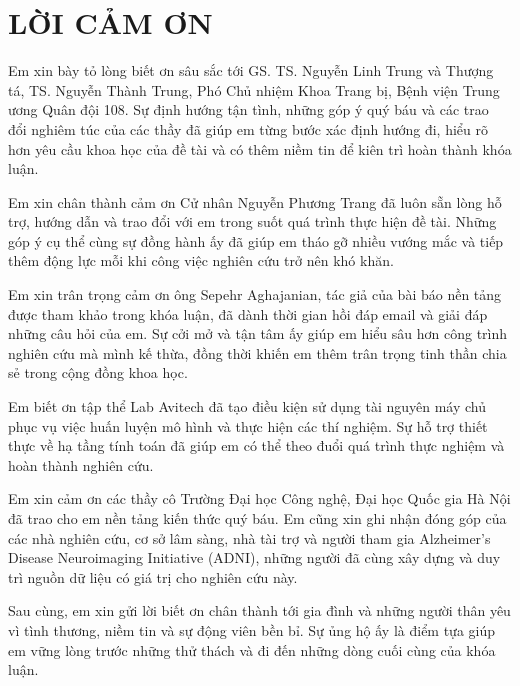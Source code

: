 \chapter*{LỜI CẢM ƠN}

Em xin bày tỏ lòng biết ơn sâu sắc tới GS. TS. Nguyễn Linh Trung và Thượng tá, TS. Nguyễn Thành Trung, Phó Chủ nhiệm Khoa Trang bị, Bệnh viện Trung ương Quân đội 108. Sự định hướng tận tình, những góp ý quý báu và các trao đổi nghiêm túc của các thầy đã giúp em từng bước xác định hướng đi, hiểu rõ hơn yêu cầu khoa học của đề tài và có thêm niềm tin để kiên trì hoàn thành khóa luận.

Em xin chân thành cảm ơn Cử nhân Nguyễn Phương Trang đã luôn sẵn lòng hỗ trợ, hướng dẫn và trao đổi với em trong suốt quá trình thực hiện đề tài. Những góp ý cụ thể cùng sự đồng hành ấy đã giúp em tháo gỡ nhiều vướng mắc và tiếp thêm động lực mỗi khi công việc nghiên cứu trở nên khó khăn.

Em xin trân trọng cảm ơn ông Sepehr Aghajanian, tác giả của bài báo nền tảng được tham khảo trong khóa luận, đã dành thời gian hồi đáp email và giải đáp những câu hỏi của em. Sự cởi mở và tận tâm ấy giúp em hiểu sâu hơn công trình nghiên cứu mà mình kế thừa, đồng thời khiến em thêm trân trọng tinh thần chia sẻ trong cộng đồng khoa học.

Em biết ơn tập thể Lab Avitech đã tạo điều kiện sử dụng tài nguyên máy chủ phục vụ việc huấn luyện mô hình và thực hiện các thí nghiệm. Sự hỗ trợ thiết thực về hạ tầng tính toán đã giúp em có thể theo đuổi quá trình thực nghiệm và hoàn thành nghiên cứu.

Em xin cảm ơn các thầy cô Trường Đại học Công nghệ, Đại học Quốc gia Hà Nội đã trao cho em nền tảng kiến thức quý báu. Em cũng xin ghi nhận đóng góp của các nhà nghiên cứu, cơ sở lâm sàng, nhà tài trợ và người tham gia Alzheimer's Disease Neuroimaging Initiative (ADNI), những người đã cùng xây dựng và duy trì nguồn dữ liệu có giá trị cho nghiên cứu này.

Sau cùng, em xin gửi lời biết ơn chân thành tới gia đình và những người thân yêu vì tình thương, niềm tin và sự động viên bền bỉ. Sự ủng hộ ấy là điểm tựa giúp em vững lòng trước những thử thách và đi đến những dòng cuối cùng của khóa luận.
